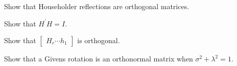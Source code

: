 \documentclass[]{book}
\theoremstyle{definition}
\theoremstyle{definition}
\theoremstyle{definition}
\theoremstyle{remark}
\let\BeginKnitrBlock\begin \let\EndKnitrBlock\end
\begin{document}
\BeginKnitrBlock{exercise}
\protect\hypertarget{exr:q505}{}{\label{exr:q505} }Show that Householder
reflections are orthogonal matrices.
\EndKnitrBlock{exercise}

\BeginKnitrBlock{solution}
\iffalse{} {Solution. } \fi{}Show that \(H^\prime H = I\).
\EndKnitrBlock{solution}

\BeginKnitrBlock{exercise}
\protect\hypertarget{exr:q506}{}{\label{exr:q506} }Show that
\(\begin{bmatrix} H_r \cdots h_1 \end{bmatrix}\) is orthogonal.
\EndKnitrBlock{exercise}

\BeginKnitrBlock{exercise}
\protect\hypertarget{exr:q507}{}{\label{exr:q507} }Show that a Givens
rotation is an orthonormal matrix when \(\sigma^2 + \lambda^2 = 1\).
\EndKnitrBlock{exercise}
\end{document}
